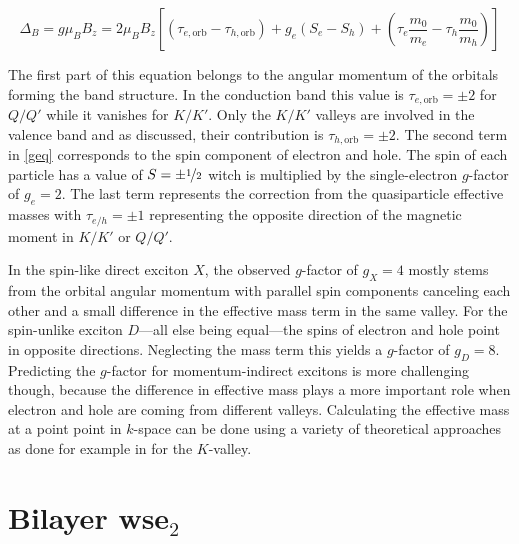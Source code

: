 \[\Delta_B=g\mu_BB_z = 2\mu_BB_z\left[(\tau_{e, \mathrm{orb}}-\tau_{h, \mathrm{orb}})+g_e(S_e-S_h) + \left(\tau_e \frac{m_0}{m_e}-\tau_h \frac{m_0}{m_h}\right)\right]\label{geq}\]

The first part of this equation belongs to the angular momentum of the orbitals forming the band structure. In the conduction band this value is $\tau_{e, \mathrm{orb}}=\pm2$ for $Q/Q'$ while it vanishes for $K/K'$. Only the $K/K'$ valleys are involved in the valence band and as discussed, their contribution is $\tau_{h, \mathrm{orb}}=\pm2$. The second term in \eqref{geq} corresponds to the spin component of electron and hole. The spin of each particle has a value of $S=\pm\nicefrac{1}{2}$ witch is multiplied by the single-electron $g$-factor of $g_e=2$. The last term represents the correction from the quasiparticle effective masses with $\tau_{e/h}=\pm1$ representing the opposite direction of the magnetic moment in $K/K'$ or $Q/Q'$.

In the spin-like direct exciton $X$, the observed $g$-factor of $g_X=4$ mostly stems from the orbital angular momentum with parallel spin components canceling each other and a small difference in the effective mass term in the same valley. For the spin-unlike exciton $D$---all else being equal---the spins of electron and hole point in opposite directions. Neglecting the mass term this yields a $g$-factor of $g_D=8$. Predicting the $g$-factor for momentum-indirect excitons is more challenging though, because the difference in effective mass plays a more important role when electron and hole are coming from different valleys. Calculating the effective mass at a point point in $k$-space can be done using a variety of theoretical approaches as done for example in \cite{rybkovskiy_atomically_2017} for the $K$-valley.

\section{Bilayer ws\textup{e}$_2$}

